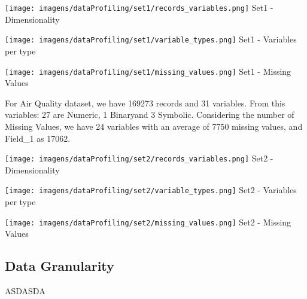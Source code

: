 \documentclass[11pt]{article}
\begin{document}
\begin{figure*}[!htp]
    \begin{minipage}[!htp]{.33\textwidth}
        \centering
        \texttt{[image: imagens/dataProfiling/set1/records\_variables.png]}
        Set1 - Dimensionality
    \end{minipage}\hfill
    \begin{minipage}[!htp]{.33\textwidth}
        \centering
        \texttt{[image: imagens/dataProfiling/set1/variable\_types.png]}
        Set1 - Variables per type
    \end{minipage}\hfill
    \begin{minipage}[!htp]{.33\textwidth}
        \centering
        \texttt{[image: imagens/dataProfiling/set1/missing\_values.png]}
        Set1 - Missing Values
    \end{minipage}\hfill
\end{figure*}

 For Air Quality dataset, we have 169273 records and 31 variables. From this variables: 27 are Numeric, 1 Binary\footnotemark[1] and 3 Symbolic. Considering the number of Missing Values, we have 24 variables with an average of 7750 missing values, and Field\_1 as 17062. 

\begin{figure*}[!htp]
    \begin{minipage}[!htp]{.33\textwidth}
        \centering
        \texttt{[image: imagens/dataProfiling/set2/records\_variables.png]}
        Set2 - Dimensionality
    \end{minipage}\hfill
    \begin{minipage}[!htp]{.33\textwidth}
        \centering
        \texttt{[image: imagens/dataProfiling/set2/variable\_types.png]}
        Set2 - Variables per type
    \end{minipage}\hfill
    \begin{minipage}[!htp]{.33\textwidth}
        \centering
        \texttt{[image: imagens/dataProfiling/set2/missing\_values.png]}
        Set2 - Missing Values
    \end{minipage}\hfill
\end{figure*}


\subsection*{Data Granularity}
 ASDASDA
\end{document}
